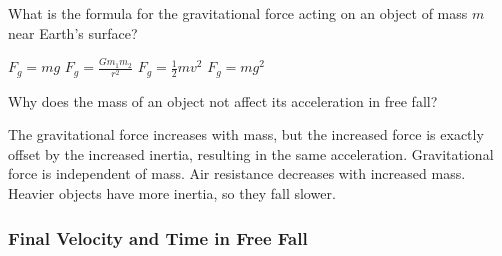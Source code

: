 \documentclass[../main-physics-problems.tex]{subfiles}
\begin{document}
\begin{questions}
\question  
What is the formula for the gravitational force acting on an object of mass \( m \) near Earth’s surface?  
\begin{randomizechoices}  
    \correctchoice \( F_g = mg \)  
    \choice \( F_g = \frac{Gm_1m_2}{r^2} \)  
    \choice \( F_g = \frac{1}{2}mv^2 \)  
    \choice \( F_g = m g^2 \)  
\end{randomizechoices}  



\question  
Why does the mass of an object not affect its acceleration in free fall?  
\begin{randomizechoices}  
    \correctchoice The gravitational force increases with mass, but the increased force is exactly offset by the increased inertia, resulting in the same acceleration.  
    \choice Gravitational force is independent of mass.  
    \choice Air resistance decreases with increased mass.  
    \choice Heavier objects have more inertia, so they fall slower.  
\end{randomizechoices}  

\end{questions}

\subsubsection{Final Velocity and Time in Free Fall}
\end{document}
